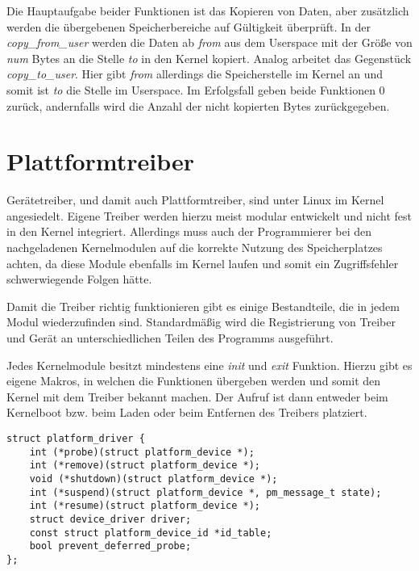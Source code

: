 Die Hauptaufgabe beider Funktionen ist das Kopieren von Daten, aber zusätzlich werden die übergebenen Speicherbereiche auf Gültigkeit überprüft. 
In der \textit{copy\_from\_user} werden die Daten ab \textit{from} aus dem Userspace mit der Größe von \textit{num} Bytes an die Stelle \textit{to} in den Kernel kopiert.
Analog arbeitet das Gegenstück \textit{copy\_to\_user}. Hier gibt \textit{from} allerdings die Speicherstelle im Kernel an und somit ist \textit{to} die Stelle im Userspace.
Im Erfolgsfall geben beide Funktionen 0 zurück, andernfalls wird die Anzahl der nicht kopierten Bytes zurückgegeben. \citep[S. 250f]{schroder2009embedded}

\section{Plattformtreiber}\label{sec:plat_t}
Gerätetreiber, und damit auch Plattformtreiber, sind unter Linux im Kernel angesiedelt. Eigene Treiber werden hierzu meist modular entwickelt und nicht fest in den Kernel integriert. Allerdings muss auch der Programmierer bei den nachgeladenen Kernelmodulen auf die korrekte Nutzung des Speicherplatzes achten, da diese Module ebenfalls im Kernel laufen und somit ein Zugriffsfehler schwerwiegende Folgen hätte. \citep[S. 231ff]{schroder2009embedded}

Damit die Treiber richtig funktionieren gibt es einige Bestandteile, die in jedem Modul wiederzufinden sind. Standardmäßig wird die Registrierung von Treiber und Gerät an unterschiedlichen Teilen des Programms ausgeführt. \cite{corbetplatform} 




Jedes Kernelmodule besitzt mindestens eine \textit{init} und \textit{exit} Funktion. Hierzu gibt es eigene Makros, in welchen die Funktionen übergeben werden und somit den Kernel mit dem Treiber bekannt machen. Der Aufruf ist dann entweder beim Kernelboot bzw. beim Laden oder beim Entfernen des Treibers platziert. \cite[linux/module.h, Zeile 79ff.]{linuxsourceinclude}

\begin{lstfloat}
\begin{lstlisting}
struct platform_driver {
	int (*probe)(struct platform_device *);
	int (*remove)(struct platform_device *);
	void (*shutdown)(struct platform_device *);
	int (*suspend)(struct platform_device *, pm_message_t state);
	int (*resume)(struct platform_device *);
	struct device_driver driver;
	const struct platform_device_id *id_table;
	bool prevent_deferred_probe;
};
\end{lstlisting}
\end{lstfloat}

